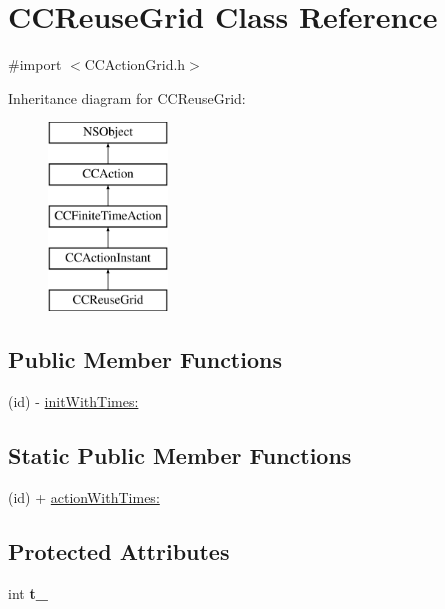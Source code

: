 \hypertarget{interface_c_c_reuse_grid}{\section{C\-C\-Reuse\-Grid Class Reference}
\label{interface_c_c_reuse_grid}
}


{\ttfamily \#import $<$C\-C\-Action\-Grid.\-h$>$}

Inheritance diagram for C\-C\-Reuse\-Grid\-:\begin{figure}[H]
\begin{center}
\leavevmode
\includegraphics[height=5.000000cm]{interface_c_c_reuse_grid}
\end{center}
\end{figure}
\subsection*{Public Member Functions}
\begin{DoxyCompactItemize}
\item 
(id) -\/ \hyperlink{interface_c_c_reuse_grid_a91042d8c3c96b4c1da6a60aaa175d046}{init\-With\-Times\-:}
\end{DoxyCompactItemize}
\subsection*{Static Public Member Functions}
\begin{DoxyCompactItemize}
\item 
(id) + \hyperlink{interface_c_c_reuse_grid_a30e9c88c208e824c2343173d7b637de8}{action\-With\-Times\-:}
\end{DoxyCompactItemize}
\subsection*{Protected Attributes}
\begin{DoxyCompactItemize}
\item 
\hypertarget{interface_c_c_reuse_grid_a896b2a680bdb10447a2d599cfe5a6be2}{int {\bfseries t\-\_\-}}\label{interface_c_c_reuse_grid_a896b2a680bdb10447a2d599cfe5a6be2}

\end{DoxyCompactItemize}


